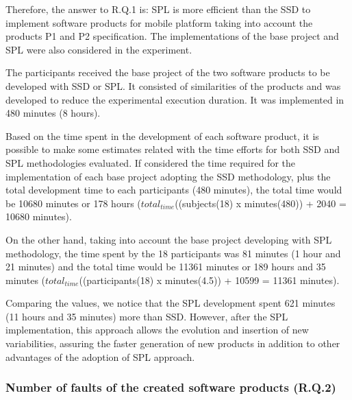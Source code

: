 \begin{itemize}
Therefore, the answer to R.Q.1 is: SPL is more efficient than the SSD to implement software products for mobile platform taking into account the products P1 and P2 specification. The implementations of the base project and SPL were also considered in the experiment.

The participants received the base project of the two software products to be developed with SSD or SPL. It consisted of similarities of the products and was developed to reduce the experimental execution duration. It was implemented in 480 minutes (8 hours).

Based on the time spent in the development of each software product, it is possible to make some estimates related with the time efforts for both SSD and SPL methodologies evaluated. If considered the time required for the implementation of each base project adopting the SSD methodology, plus the total development time to each participants (480 minutes), the total time would be 10680 minutes or 178 hours ($total_{time}$((subje\allowbreak cts(18) x minutes(480)) + 2040 = 10680 minutes). 

On the other hand, taking into account the base project developing with SPL methodology, the time spent by the 18 participants was 81 minutes (1 hour and 21 minutes) and the total time would be 11361 minutes or 189 hours and 35 minutes ($total_{time}$((participants(18) x minutes(4.5)) + 10599 = 11361 minutes). 

Comparing the values, we notice that the SPL development spent 621 minutes (11 hours and 35 minutes) more than SSD. However, after the SPL implementation, this approach allows the evolution and insertion of new variabilities, assuring the faster generation of new products in addition to other advantages of the adoption of SPL approach.

\end{itemize}

\subsubsection{Number of faults of the created software products (R.Q.2)}

